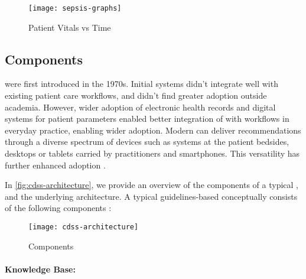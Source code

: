 \begin{figure}[t]
  \centering
  \texttt{[image: sepsis-graphs]}
  \caption{Patient Vitals vs Time}\label{fig:sepsis-graphs-view}
\end{figure}


\subsection{\CDSS{} Components}\label{sec:cdss-components}

\CDSSs{} were first introduced in the 1970s. Initial systems
didn't integrate well with existing patient care workflows, and
didn't find greater adoption outside academia. However,
wider adoption of electronic health records and digital systems for
patient parameters enabled better integration of \CDSSs{} with
workflows in everyday practice, enabling wider adoption.
Modern \CDSS{} can deliver recommendations
through a diverse spectrum of devices such
as systems at the patient bedsides, desktops or tablets carried by
practitioners and smartphones. This versatility
has further enhanced \CDSSs{} adoption \cite{SuttonNature20}.

In \autoref{fig:cdss-architecture}, we provide an overview
of the components of a typical \CDSS{}, and the underlying architecture.
A typical guidelines-based \CDSS{} conceptually consists of the
following components \cite{SuttonNature20}:

\begin{figure}[h]
  \centering
  \texttt{[image: cdss-architecture]}
  \caption{\CDSS{} Components}\label{fig:cdss-architecture}
\end{figure}


\paragraph{Knowledge Base:}

